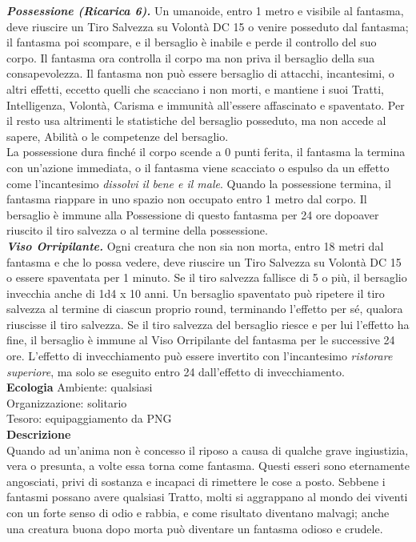 \begin{multicols}{2}
\emph{\textbf{Possessione (Ricarica 6).}} Un umanoide, entro 1 metro e visibile al fantasma, deve riuscire un Tiro Salvezza su Volontà DC  15 o venire posseduto dal fantasma; il fantasma poi scompare, e il bersaglio è inabile e perde il controllo del suo corpo. Il fantasma ora controlla il corpo ma non priva il bersaglio della sua consapevolezza. Il fantasma non può essere bersaglio di attacchi, incantesimi, o altri effetti, eccetto quelli che scacciano i non morti, e mantiene i suoi Tratti, Intelligenza, Volontà, Carisma e immunità all'essere affascinato e spaventato. Per il resto usa altrimenti le statistiche del bersaglio posseduto, ma non accede al sapere, Abilità o le competenze del bersaglio.\\
La possessione dura finché il corpo scende a 0 punti ferita, il fantasma la termina con un'azione immediata, o il fantasma viene scacciato o espulso da un effetto come l'incantesimo \emph{dissolvi il bene e il male}. Quando la possessione termina, il fantasma riappare in uno spazio non occupato entro 1 metro dal corpo. Il bersaglio è immune alla Possessione di questo fantasma per 24 ore dopoaver riuscito il tiro  salvezza o al termine della possessione.\\

\emph{\textbf{Viso Orripilante.}} Ogni creatura che non sia non morta, entro 18 metri  dal fantasma e che lo possa vedere, deve riuscire un Tiro Salvezza su Volontà DC  15 o essere spaventata per 1 minuto. Se il tiro salvezza  fallisce di 5 o più, il bersaglio invecchia anche di 1d4 x 10 anni. Un  bersaglio spaventato può ripetere il tiro salvezza al termine di ciascun  proprio round, terminando l'effetto per sé, qualora riuscisse il tiro  salvezza. Se il tiro salvezza del bersaglio riesce e per lui l'effetto ha fine, il  bersaglio è immune al Viso Orripilante del fantasma per le successive 24  ore. L'effetto di invecchiamento può essere invertito con l'incantesimo \emph{ristorare superiore}, ma solo se eseguito entro 24 dall'effetto di invecchiamento.\\
\textbf{Ecologia}
Ambiente: qualsiasi\\
Organizzazione: solitario\\
Tesoro: equipaggiamento da PNG\\
\textbf{Descrizione}\\
Quando ad un'anima non è concesso il riposo a causa di qualche grave ingiustizia, vera o presunta, a volte essa torna come fantasma. Questi esseri sono eternamente angosciati, privi di sostanza e incapaci di rimettere le cose a posto. Sebbene i fantasmi possano avere qualsiasi Tratto, molti si aggrappano al mondo dei viventi con un forte senso di odio e rabbia, e come risultato diventano  malvagi; anche una creatura buona dopo morta può diventare un fantasma odioso e crudele.\\


\end{multicols}
